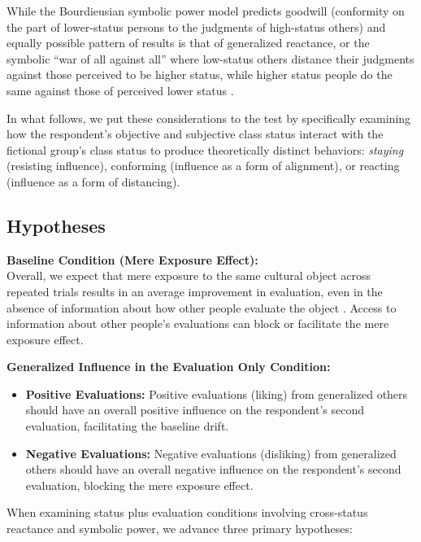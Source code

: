 \documentclass[12pt, letterpaper]{article}
\begin{document}
While the Bourdieusian symbolic power model predicts goodwill (conformity on the part of lower-status persons to the judgments of high-status others) and equally possible pattern of results is that of generalized reactance, or the symbolic ``war of all against all'' where low-status others distance their judgments against those perceived to be higher status, while higher status people do the same against those of perceived lower status \cite{tampubolon2008revisiting}.

In what follows, we put these considerations to the test by specifically examining how the respondent's objective and subjective class status interact with the fictional group's class status to produce theoretically distinct behaviors: \textit{staying} (resisting influence), conforming (influence as a form of alignment), or reacting (influence as a form of distancing).

\subsection{Hypotheses}

\textbf{Baseline Condition (Mere Exposure Effect):}\\
Overall, we expect that mere exposure to the same cultural object across repeated trials results in an average improvement in evaluation, even in the absence of information about how other people evaluate the object \citep{reber1998effects-efe}. Access to information about other people’s evaluations can block or facilitate the mere exposure effect.

\textbf{Generalized Influence in the Evaluation Only Condition:}
\begin{itemize}
    \item \textbf{Positive Evaluations:} Positive evaluations (liking) from generalized others should have an overall positive influence on the respondent’s second evaluation, facilitating the baseline drift.
    \item \textbf{Negative Evaluations:} Negative evaluations (disliking) from generalized others should have an overall negative influence on the respondent’s second evaluation, blocking the mere exposure effect.
\end{itemize}

When examining status plus evaluation conditions involving cross-status reactance and symbolic power, we advance three primary hypotheses:
\end{document}

